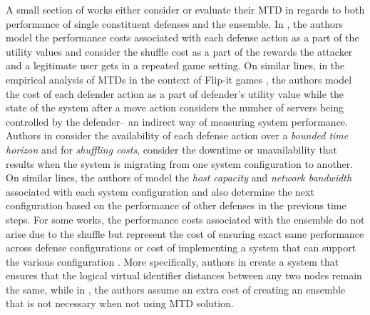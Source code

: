 A small section of works either consider or evaluate their MTD in regards to both {performance} of {single constituent} defenses and the {ensemble}. In , the authors model the performance {costs} associated with {each defense action} as a part of the utility values and consider the {shuffle cost} as a part of the rewards the attacker and a legitimate user gets in a repeated game setting. On similar lines, in the empirical analysis of MTDs in the context of {Flip-it} games , the authors model the cost of each defender action as a part of {defender's utility} value while the state of the system after a move action considers the number of {servers} being {controlled} by the {defender}-- an indirect way of measuring system performance. Authors in  consider the availability of each defense action over a \emph{bounded time horizon} and for \emph{shuffling costs}, consider the downtime or unavailability that results when the system is migrating from one system configuration to another. On similar lines, the authors of  model the \emph{host capacity} and \emph{network bandwidth} associated with each system configuration and also determine the next configuration based on the performance of other defenses in the previous time steps. For some works, the performance costs associated with the ensemble do not arise due to the shuffle but represent the cost of ensuring exact same performance across defense configurations  or cost of implementing a system that can support the various configuration . More specifically, authors in  create a system that ensures that the logical virtual identifier distances between any two nodes remain the same, while in , the authors assume an extra cost of creating an ensemble that is not necessary when not using MTD solution.

